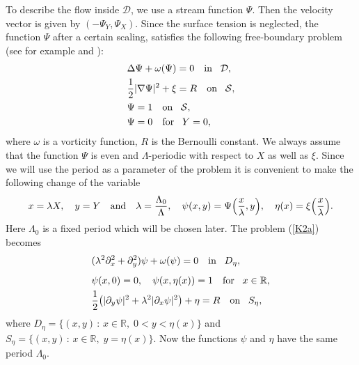 \documentclass[oneside,a4paper,11pt]{article}
\theoremstyle{thmstyletwo}%
\theoremstyle{thmstylethree}%
\numberwithin{equation}{section}
\begin{document}
 To describe the flow inside $\mathcal{D}$, we use a stream function $\Psi$. Then the velocity vector is given by  $(-\Psi_Y,\Psi_X)$. Since the surface tension is neglected, the function $\Psi$  after a certain scaling, satisfies the following free-boundary problem (see for example \cite{CSst} and \cite{KN14}):
\begin{equation}\label{K2a}
\begin{aligned}
&\Delta \Psi+\omega(\Psi)=0\quad\mbox{in\!}\quad\mathcal{D},\\
&\frac{1}{2}|\nabla\Psi|^2+\xi=R\quad\mbox{on\!}\quad\mathcal{S},\\
&\Psi=1\quad\mbox{on\!}\quad\mathcal{S},\\
&\Psi=0\quad\mbox{for\!}\quad Y=0,
\end{aligned}
\end{equation}
where $\omega$ is a vorticity function, $R$ is the Bernoulli constant.
We always assume that the function $\Psi$ is even and $\Lambda$-periodic with respect to $X$ as well as $\xi$. Since we will use the period as a parameter of the problem it is convenient to make the following change of the variable
$$
x=\lambda X,\quad y=Y\quad\mbox{and}\quad\lambda=\frac{\Lambda_0}{\Lambda},\quad \psi(x,y)=\Psi\Bigl(\frac{x}{\lambda},y\Bigr),\quad\eta(x)=\xi\Bigl(\frac{x}{\lambda}\Bigr).
$$
Here $\Lambda_0$ is a fixed period which will be chosen later.
The problem (\ref{K2a}) becomes
\begin{equation}\label{Okt31a}
\begin{aligned}
&(\lambda^2\partial_x^2+\partial_y^2)\psi+\omega(\psi)=0\quad\mbox{in\!}\quad D_\eta,\\[1.5mm]
&\psi(x,0)=0,\quad\psi(x,\eta(x))=1\quad\mbox{for\!}\quad x\in\mathbb{R},\\
&\frac{1}{2}\bigl(|\partial_y\psi|^2+\lambda^2|\partial_x\psi|^2\bigr)+\eta=R\quad\mbox{on\!}\quad S_\eta,
\end{aligned}
\end{equation}
where $ D_\eta=\{(x,y)\,:\, x\in\mathbb{R},\;0<y<\eta(x) \}$ and $S_\eta=\{(x,y)\,:\,x\in \mathbb{R},\;y=\eta(x)\}$.
Now the functions $\psi$ and $\eta$ have the same period $\Lambda_0$.
\end{document}
